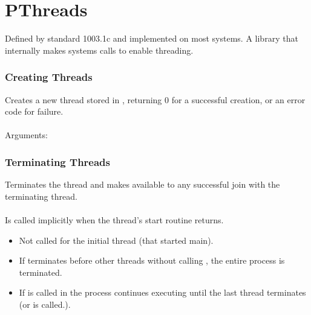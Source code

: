 \documentclass{report}
\begin{document}
\section*{PThreads}

Defined by  standard 1003.1c and implemented on most  systems. A library that internally makes systems calls to enable threading.


\subsubsection*{Creating Threads}

Creates a new thread stored in , returning $0$ for a successful creation, or an error code for failure.
\\
\\ Arguments:
\begin{itemize}
\end{itemize}
\subsubsection*{Terminating Threads}

Terminates the thread and makes  available to any successful join with the terminating thread.
\\
\\ Is called implicitly when the thread's start routine returns.
\begin{itemize}
	\item Not called for the initial thread (that started main).
	\item If  terminates before other threads without calling , the entire process is terminated.
	\item If  is called in  the process continues executing until the last thread terminates (or  is called.).
\end{itemize}

\end{document}
